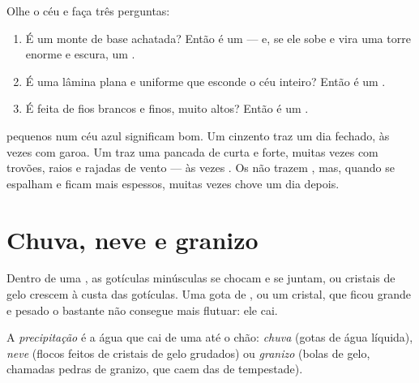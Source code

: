 \begin{method}\label{met:g4:clouds-rain-snow:naming}
Olhe o céu e faça três perguntas:
\begin{enumerate}
  \item É um monte de base achatada? Então é um  --- e, se ele
        sobe e vira uma torre enorme e escura, um .
  \item É uma lâmina plana e uniforme que esconde o céu inteiro? Então é
        um .
  \item É feita de fios brancos e finos, muito altos? Então é um .
\end{enumerate}
\end{method}

\begin{remark}\label{rem:g4:clouds-rain-snow:tell}
 pequenos num céu azul significam  bom. Um  cinzento
traz um dia fechado, às vezes com garoa. Um  traz uma pancada
de  curta e forte, muitas vezes com trovões, raios e rajadas de vento
--- às vezes . Os  não trazem , mas, quando se espalham e
ficam mais espessos, muitas vezes chove um dia depois.
\end{remark}

\section{Chuva, neve e granizo}

Dentro de uma , as gotículas minúsculas se chocam e se juntam, ou
cristais de gelo crescem à custa das gotículas. Uma gota de , ou um
cristal, que ficou grande e pesado o bastante não consegue mais flutuar: ele cai.

\begin{definition}[Precipitação]\label{def:g4:clouds-rain-snow:precipitation}
A \emph{precipitação} é a água que cai de uma 
até o chão: \emph{chuva} (gotas de água líquida),
\emph{neve} (flocos feitos de cristais de gelo grudados) ou
\emph{granizo} (bolas de gelo, chamadas pedras de granizo,
que caem das  de tempestade).
\end{definition}

